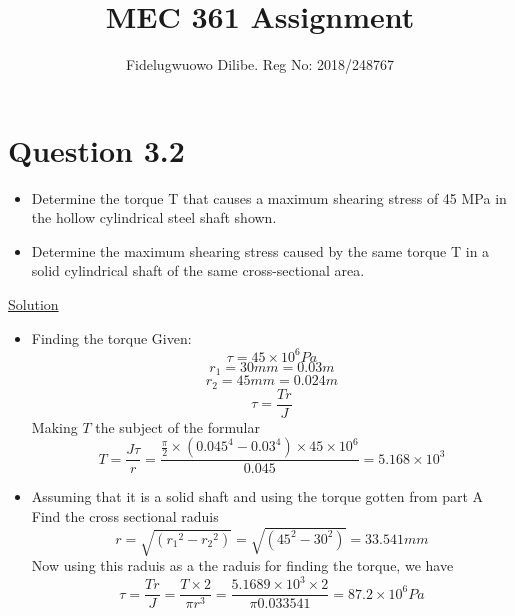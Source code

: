 \documentclass{article}
\title{MEC 361 Assignment}
\author{Fidelugwuowo Dilibe. Reg No: 2018/248767}
\begin{document}
\maketitle
\newpage

\section*{Question 3.2}
\begin{itemize}
\item  Determine the torque T that causes a maximum shearing stress of 45 MPa in the hollow cylindrical steel shaft shown.
\item Determine the maximum shearing stress caused by the same torque T in a solid cylindrical shaft of the same cross-sectional area.
\end{itemize}
\begin{center}\underline{Solution}\end{center}
\begin{itemize}
\item Finding the torque \newline
 Given: \[\tau = 45 \times 10^{6}Pa\]\[r_{1} = 30mm = 0.03m\]\[r_{2} = 45mm = 0.024m\]
\[\tau = \frac{{T}{r}}{J}\]
Making $ T$ the subject of the formular
\[T = \frac{J\tau}{r} = \frac{{\frac{\pi}{2}}\times(0.045^{4} - 0.03^{4})\times 45 \times 10^{6}}{0.045} = 5.168\times 10^{3}\]
\item Assuming that it is a solid shaft and using the torque gotten from part A
Find the cross sectional raduis \[r = \sqrt{ ({r_{1}}^{2} - {r_{2}}^{2} ) }=\sqrt{ ({45}^{2} - {30}^{2} ) }= 33.541mm\]
Now using this raduis as a the raduis for finding the torque, we have
\[\tau = \frac{{T}{r}}{J} = \frac{{T}\times{2}}{{\pi}{r^{3}}} = \frac{{5.1689\times 10^{3}}\times{2}}{{\pi}{0.033541}} = {87.2\times10^{6}Pa}\]
\end{itemize}

\end{document}
